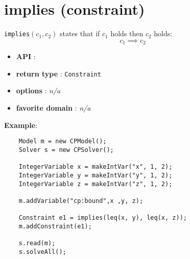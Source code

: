 \label{implies}
\hypertarget{implies}{}

\section{implies (constraint)}\label{implies:impliesconstraint}\hypertarget{implies:impliesconstraint}{}
\begin{notedef}
  \texttt{implies}$(c_1,c_2)$ states that if $c_1$ holds then $c_2$ holds:
$$c_1\implies c_2$$
\end{notedef}

\begin{itemize}
	\item \textbf{API} : 
	\item \textbf{return type} : \texttt{Constraint}
	\item \textbf{options} : \emph{n/a}
	\item \textbf{favorite domain} : \emph{n/a}
\end{itemize}

\textbf{Example}:
\begin{lstlisting}
	Model m = new CPModel();
	Solver s = new CPSolver();
	
	IntegerVariable x = makeIntVar("x", 1, 2);
	IntegerVariable y = makeIntVar("y", 1, 2);
	IntegerVariable z = makeIntVar("z", 1, 2);
	
	m.addVariable("cp:bound",x ,y, z);
	
	Constraint e1 = implies(leq(x, y), leq(x, z));
	m.addConstraint(e1);
	
	s.read(m);
	s.solveAll();
\end{lstlisting}
